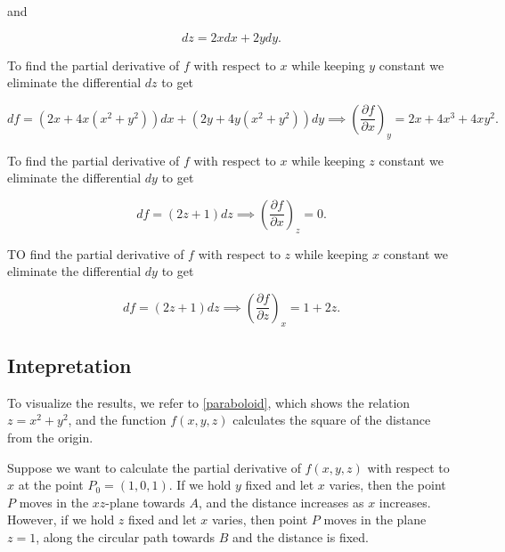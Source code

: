 \documentclass[english,a4paper,12pt]{report}
\begin{document}
and 

\begin{equation}
	dz = 2x dx + 2y dy.
\end{equation}

To find the partial derivative of \(f\) with respect to \(x\) while keeping \(y\) constant we eliminate the differential \(dz\) to get 

\begin{equation}
	df = (2x + 4x(x^2+y^2))dx + (2y+4y(x^2+y^2))dy \implies \left( \frac{\partial f}{\partial x} \right)_{y} = 2x + 4x^3 + 4xy^2.
\end{equation}

To find the partial derivative of \(f\) with respect to \(x\) while keeping \(z\) constant we eliminate the differential \(dy\) to get 

\begin{equation}
	df = (2z+1)dz \implies \left( \frac{\partial f}{\partial x} \right)_{z} = 0. 
\end{equation}

TO find the partial derivative of \(f\) with respect to \(z\) while keeping \(x\) constant we eliminate the differential \(dy\) to get 

\begin{equation}
	df = (2z+1)dz \implies \left( \frac{\partial f}{\partial z} \right)_{x} = 1+2z.
\end{equation}


\subsection{Intepretation}

To visualize the results, we refer to \cref{paraboloid}, which shows the relation \(z = x^2+y^2\), and the function \(f(x,y,z)\) calculates the square of the distance from the origin. 

Suppose we want to calculate the partial derivative of \(f(x,y,z)\) with respect to \(x\) at the point \(P_0 = (1,0,1)\). If we hold \(y\) fixed and let \(x\) varies, then the point \(P\) moves in the \(xz\)-plane towards \(A\), and the distance increases as \(x\) increases. However, if we hold \(z\) fixed and let \(x\) varies, then point \(P\) moves in the plane \(z = 1\), along the circular path towards \(B\) and the distance is fixed.   

\end{document}
